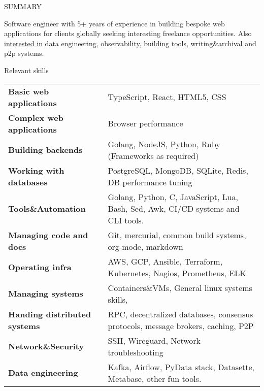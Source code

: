 \documentclass{resume} %
\begin{document}

\begin{rSection}{SUMMARY}

  {Software engineer with 5+ years of experience in building bespoke web applications for clients globally seeking interesting freelance opportunities. Also \href{https://geekodour.org/docs/documents/collaborate/#strengths-and-specialties}{interested in} data engineering, observability, building tools, writing\&archival and p2p systems.}

\end{rSection}

\begin{rSection}{Relevant skills}
  \begin{tabular}{ @{} >{\bfseries}l @{\hspace{6ex}} l }
    Basic web applications & TypeScript, React, HTML5, CSS\\
    Complex web applications & Browser performance\\
    Building backends & Golang, NodeJS, Python, Ruby (Frameworks as required)\\
    Working with databases & PostgreSQL, MongoDB, SQLite, Redis, DB performance tuning\\
    Tools\&Automation & Golang, Python, C, JavaScript, Lua, Bash, Sed, Awk, CI/CD systems and CLI tools.\\
    Managing code and docs & Git, mercurial, common build systems, org-mode, markdown\\
    Operating infra & AWS, GCP, Ansible, Terraform, Kubernetes, Nagios, Prometheus, ELK\\
    Managing systems & Containers\&VMs, General linux systems skills,\\
    Handing distributed systems & RPC, decentralized databases, consensus protocols, message brokers, caching, P2P\\
    Network\&Security & SSH, Wireguard, Network troubleshooting\\
    Data engineering & Kafka, Airflow, PyData stack, Datasette, Metabase, other fun tools.\\
  \end{tabular}\
\end{rSection}
\end{document}
